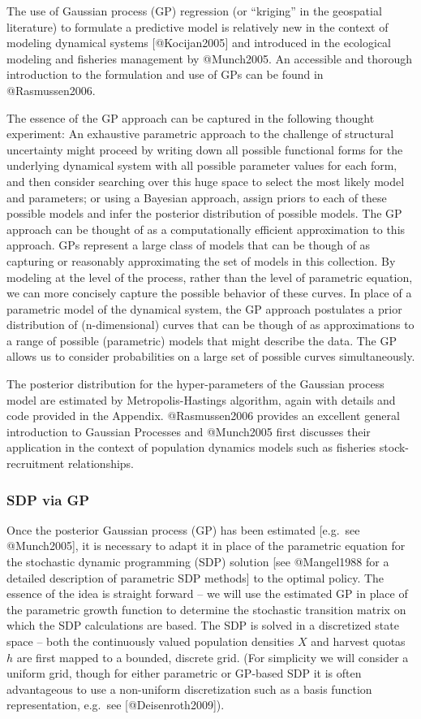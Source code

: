\documentclass[author-year, review]{elsarticle} %
\begin{document}
The use of Gaussian process (GP) regression (or ``kriging'' in the
geospatial literature) to formulate a predictive model is relatively new
in the context of modeling dynamical systems {[}@Kocijan2005{]} and
introduced in the ecological modeling and fisheries management by
@Munch2005. An accessible and thorough introduction to the formulation
and use of GPs can be found in @Rasmussen2006.

The essence of the GP approach can be captured in the following thought
experiment: An exhaustive parametric approach to the challenge of
structural uncertainty might proceed by writing down all possible
functional forms for the underlying dynamical system with all possible
parameter values for each form, and then consider searching over this
huge space to select the most likely model and parameters; or using a
Bayesian approach, assign priors to each of these possible models and
infer the posterior distribution of possible models. The GP approach can
be thought of as a computationally efficient approximation to this
approach. GPs represent a large class of models that can be though of as
capturing or reasonably approximating the set of models in this
collection. By modeling at the level of the process, rather than the
level of parametric equation, we can more concisely capture the possible
behavior of these curves. In place of a parametric model of the
dynamical system, the GP approach postulates a prior distribution of
(n-dimensional) curves that can be though of as approximations to a
range of possible (parametric) models that might describe the data. The
GP allows us to consider probabilities on a large set of possible curves
simultaneously.

The posterior distribution for the hyper-parameters of the Gaussian
process model are estimated by Metropolis-Hastings algorithm, again with
details and code provided in the Appendix. @Rasmussen2006 provides an
excellent general introduction to Gaussian Processes and @Munch2005
first discusses their application in the context of population dynamics
models such as fisheries stock-recruitment relationships.

\subsubsection{SDP via GP}

Once the posterior Gaussian process (GP) has been estimated {[}e.g.~see
@Munch2005{]}, it is necessary to adapt it in place of the parametric
equation for the stochastic dynamic programming (SDP) solution {[}see
@Mangel1988 for a detailed description of parametric SDP methods{]} to
the optimal policy. The essence of the idea is straight forward -- we
will use the estimated GP in place of the parametric growth function to
determine the stochastic transition matrix on which the SDP calculations
are based. The SDP is solved in a discretized state space -- both the
continuously valued population densities $X$ and harvest quotas $h$ are
first mapped to a bounded, discrete grid. (For simplicity we will
consider a uniform grid, though for either parametric or GP-based SDP it
is often advantageous to use a non-uniform discretization such as a
basis function representation, e.g.~see {[}@Deisenroth2009{]}).
\end{document}
